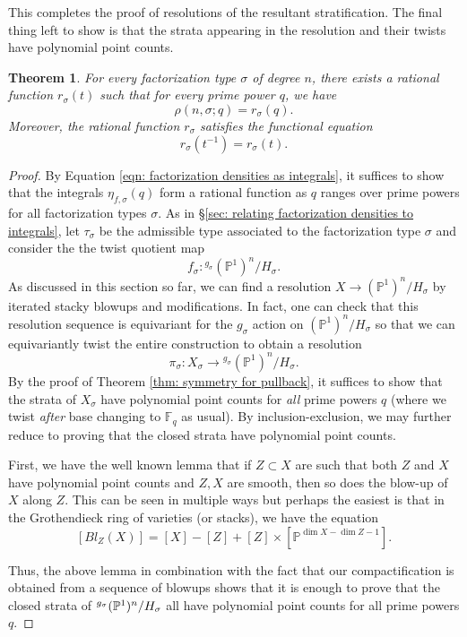 \documentclass[10pt]{article}
\theoremstyle{plain}
\newtheorem{thm}[theorem]{Theorem}
\theoremstyle{definition}
\numberwithin{equation}{section}
\begin{document}
This completes the proof of resolutions of the resultant stratification. The final thing left to show is that the strata appearing in the resolution and their twists have polynomial point counts.

\begin{thm}\label{thm: rationality of wild-type densities}
    For every factorization type $\sigma$ of degree $n$, there exists a rational function $r_\sigma(t)$ such that for \emph{every} prime power $q$, we have
        \[\rho(n,\sigma;q) = r_\sigma(q).\]
    Moreover, the rational function $r_\sigma$ satisfies the functional equation
        \[r_\sigma(t^{-1}) = r_\sigma(t).\]
\end{thm}
\begin{proof}
    By Equation \ref{eqn: factorization densities as integrals}, it suffices to show that the integrals $\eta_{f,\sigma}(q)$ form a rational function as $q$ ranges over prime powers for all factorization types $\sigma$. As in \S \ref{sec: relating factorization densities to integrals}, let $\tau_\sigma$ be the admissible type associated to the factorization type $\sigma$ and consider the the twist quotient map
        \[ f_\sigma: {^{g_\sigma}(\mathbb P^1)^n} / H_\sigma. \]
    As discussed in this section so far, we can find a resolution $X \to (\mathbb P^1)^n/H_\sigma$ by iterated stacky blowups and modifications. In fact, one can check that this resolution sequence is equivariant for the $g_\sigma$ action on $(\mathbb P^1)^n/H_\sigma$ so that we can equivariantly twist the entire construction to obtain a resolution
        \[ \pi_\sigma: X_\sigma \to {^{g_\sigma}(\mathbb P^1)^n} / H_\sigma.\]
    By the proof of Theorem \ref{thm: symmetry for pullback}, it suffices to show that the strata of $X_\sigma$ have polynomial point counts for \emph{all} prime powers $q$ (where we twist \emph{after} base changing to $\mathbb F_q$ as usual). By inclusion-exclusion, we may further reduce to proving that the closed strata have polynomial point counts.
    
    First, we have the well known lemma that if $Z \subset X$ are such that both $Z$ and $X$ have polynomial point counts and $Z,X$ are smooth, then so does the blow-up of $X$ along $Z$. This can be seen in multiple ways but perhaps the easiest is that in the Grothendieck ring of varieties (or stacks), we have the equation
        \[ [Bl_Z(X)] = [X]- [Z] + [Z]\times[\mathbb P^{\dim X-\dim Z-1}].\]

    Thus, the above lemma in combination with the fact that our compactification is obtained from a sequence of blowups shows that it is enough to prove that the closed strata of $^{g_{\sigma}}({\mathbb P}^1)^n/H_{\sigma}$ all have polynomial point counts for all prime powers $q$. 
    

\end{proof}
\end{document}
